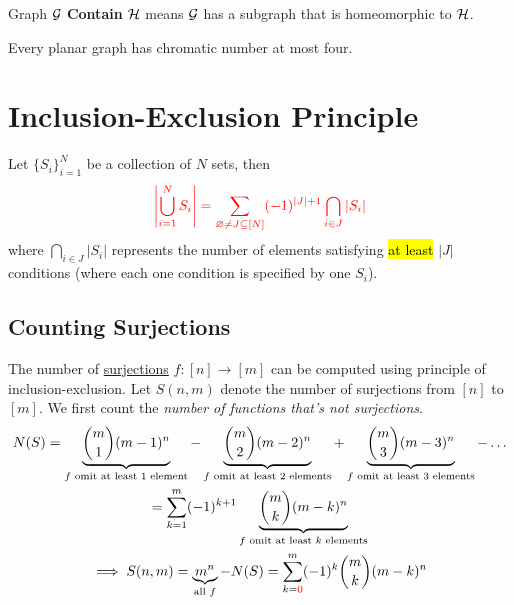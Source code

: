 \documentclass{article}
\begin{document}
			\begin{definition}
				Graph $\mathcal{{G}}$ \textbf{Contain} $\mathcal{{H}}$ means $\mathcal{{G}}$ has a subgraph that is homeomorphic to $\mathcal{{H}}$.
			\end{definition}
			
			\begin{theorem}
				Every planar graph has chromatic number at most four.
			\end{theorem}
		
		\section{Inclusion-Exclusion Principle}
			\begin{theorem}
				Let $\{S_i\}_{i=1}^N$ be a collection of $N$ sets, then
				\begin{equation}
				\textcolor{red}{
					\left\vert \bigcup_{i=1}^N S_i \right\vert = \sum_{\varnothing \neq J \subseteq [N]} (-1)^{|J|+1} \bigcap_{i \in J} \left\vert S_i \right\vert
				}
				\end{equation}
				where $\bigcap_{i \in J} \left\vert S_i \right\vert$ represents the number of elements satisfying \hl{at least} $|J|$ conditions (where each one condition is specified by one $S_i$).
			\end{theorem}
		
			\subsection{Counting Surjections}
				\begin{theorem}
					The number of \ul{surjections} $f: [n] \to [m]$ can be computed using principle of inclusion-exclusion. Let $S(n, m)$ denote the number of surjections from $[n]$ to $[m]$. We first count the \emph{number of functions that's not surjections}.
					\begin{gather}
						N(S) = \underbrace{\binom{m}{1} (m-1)^n}_{f \text{{ omit at least 1 element}}} 
						- \underbrace{\binom{m}{2} (m-2)^n}_{f \text{{ omit at least 2 elements}}}
						+ \underbrace{\binom{m}{3} (m-3)^n}_{f \text{{ omit at least 3 elements}}} - \dots \\
						= \sum_{k=1}^m (-1)^{k+1} \underbrace{\binom{m}{k} (m-k)^n}_{f \text{{ omit at least $k$ elements}}} \\
					\implies S(n, m) = \underbrace{m^n}_{\text{{all }} f} - N(S) = \sum_{k=\textcolor{red}{0}}^m (-1)^{k} \binom{m}{k} (m-k)^n
					\end{gather}
				\end{theorem}
				
\end{document}
